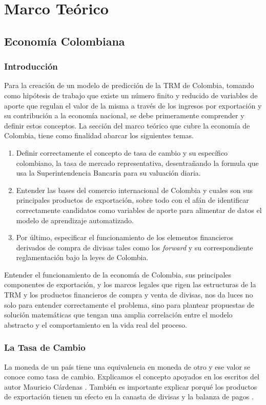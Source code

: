 \documentclass[letterpaper, spanish, 11pt]{report}
\begin{document}
\chapter{Marco Teórico}

\section{Economía Colombiana}

\subsection{Introducción}
Para la creación de un modelo de predicción de la TRM de Colombia, tomando como hipótesis de trabajo que existe un número finito y reducido de variables de aporte que regulan el valor de la misma a través de los ingresos por exportación y su contribución a la economía nacional, se debe primeramente comprender y definir estos conceptos. La sección del marco teórico que cubre la economía de Colombia, tiene como finalidad abarcar los siguientes temas. 

\begin{enumerate}
	\item Definir correctamente el concepto de tasa de cambio y su específico colombiano, la tasa de mercado representativa, desentrañando la formula que usa la Superintendencia Bancaria para su valuación diaria.
	\item Entender las bases del comercio internacional de Colombia y cuales son sus principales productos de exportación, sobre todo con el afán de identificar correctamente candidatos como variables de aporte para alimentar de datos el modelo de aprendizaje automatizado. 
	\item Por último, especificar el funcionamiento de los elementos financieros derivados de compra de divisas tales como los \emph{forward} y su correspondiente reglamentación bajo la leyes de Colombia. 
\end{enumerate}

Entender el funcionamiento de la economía de Colombia, sus principales componentes de exportación, y los marcos legales que rigen las estructuras de la TRM y los productos financieros de compra y venta de divisas, nos da luces no solo para entender correctamente el problema, sino para plantear propuestas de solución matemáticas que tengan una amplia correlación entre el modelo abstracto y el comportamiento en la vida real del proceso. 
\subsection{La Tasa de Cambio}
La moneda de un país tiene una equivalencia en moneda de otro y ese valor se conoce como tasa de cambio. Explicamos el concepto apoyados en los escritos del autor Mauricio Cárdenas \cite{cardenas}. También es importante explicar porqué los productos de exportación tienen un efecto en la canasta de divisas y la balanza de pagos \cite{crisisCambiarias}.   
\end{document}
